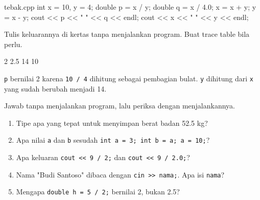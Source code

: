 \documentclass[a4paper]{article}
\begin{document}
\begin{MKode}{tebak.cpp}
int x = 10, y = 4;
double p = x / y;
double q = x / 4.0;
x = x + y;
y = x - y;
cout << p << " " << q << endl;
cout << x << " " << y << endl;
\end{MKode}
\begin{Tebak}[]
Tulis keluarannya di kertas tanpa menjalankan program. Buat trace table bila perlu.
\end{Tebak}
\begin{Jawaban}[]
\begin{MKeluaran}[]
2 2.5
14 10
\end{MKeluaran}
\texttt{p} bernilai 2 karena \texttt{10 / 4} dihitung sebagai pembagian bulat. \texttt{y} dihitung dari \texttt{x} yang sudah berubah menjadi 14.
\end{Jawaban}
\par\vspace{4pt}\par\vspace{6pt}
Jawab tanpa menjalankan program, lalu periksa dengan menjalankannya.
\begin{enumerate}
\item Tipe apa yang tepat untuk menyimpan berat badan 52.5 kg?
\item Apa nilai \texttt{a} dan \texttt{b} sesudah \texttt{int a = 3; int b = a; a = 10;}?
\item Apa keluaran \texttt{cout << 9 / 2;} dan \texttt{cout << 9 / 2.0;}?
\item Nama "Budi Santoso" dibaca dengan \texttt{cin >> nama;}. Apa isi \texttt{nama}?
\item Mengapa \texttt{double h = 5 / 2;} bernilai 2, bukan 2.5?
\end{enumerate}
\end{document}
